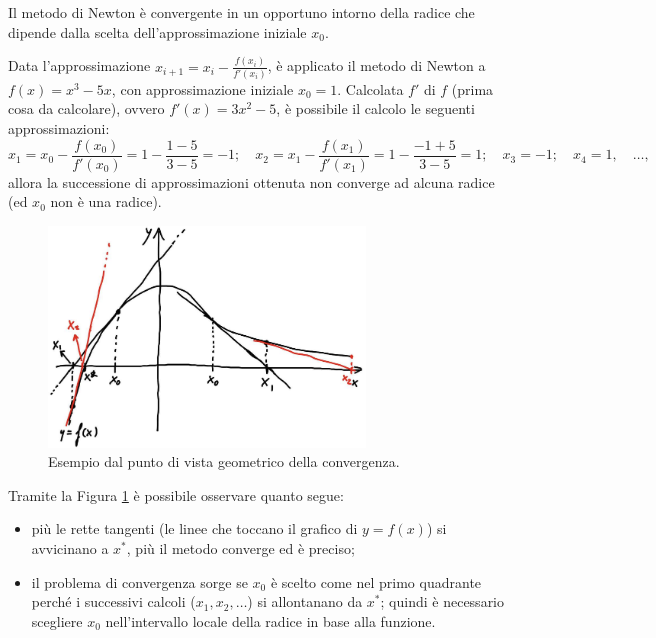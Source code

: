 Il metodo di Newton è convergente in un opportuno intorno della radice che dipende dalla scelta dell'approssimazione iniziale $x_0$.
\begin{example} 
	Data l'approssimazione $x_{i+1}=x_i-\frac{f(x_i)}{f'(x_i)}$, è applicato il metodo di Newton a $f(x)=x^3-5x$, con approssimazione iniziale $x_0=1$. Calcolata $f'$ di $f$ (prima cosa da calcolare), ovvero $f'(x)=3x^2-5$, è possibile il calcolo le seguenti approssimazioni:
	\begin{equation*}
		x_1=x_0-\frac{f(x_0)}{f'(x_0)}=1-\frac{1-5}{3-5}=-1;\quad x_2=x_1-\frac{f(x_1)}{f'(x_1)}=1-\frac{-1+5}{3-5}=1;\quad x_3=-1;\quad x_4=1,\quad\hdots,
	\end{equation*}
	allora la successione di approssimazioni ottenuta non converge ad alcuna radice (ed $x_0$ non è una radice).
\end{example}

\begin{figure}
	\centering
	\includegraphics[width=0.75\textwidth]{immagini/EsemGeoConv.png}
	\caption{\label{fig:EsemGeoConv}Esempio dal punto di vista geometrico della convergenza.}
\end{figure}

Tramite la Figura \ref{fig:EsemGeoConv} è possibile osservare quanto segue: \begin{itemize}
	\item più le rette tangenti (le linee che toccano il grafico di $y=f(x)$) si avvicinano a $x^*$, più  il metodo converge ed è preciso;
	\item il problema di convergenza sorge se $x_0$ è scelto come nel primo quadrante perché i successivi calcoli ($x_1, x_2, \hdots$) si allontanano da $x^*$; quindi è necessario scegliere $x_0$ nell'intervallo locale della radice in base alla funzione.
\end{itemize}

